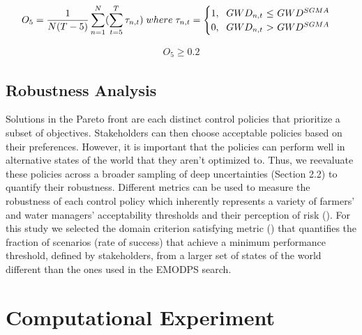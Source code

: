 \documentclass[11pt,a4paper]{article}
\begin{document}
\begin{align}
O_{5} = \frac{1}{N(T-5)}\sum_{n=1}^N(\sum_{t=5}^T \tau_{n,t})\; where\; \tau_{n,t} = \begin{cases}
      1, \text{\; $GWD_{n,t}$  $\leq$ $GWD^{SGMA}$}\\
      0, \text{\; $GWD_{n,t}$ $>$ $GWD^{SGMA}$}\\
\end{cases}      
\end{align}


\begin{align}
O_{5} \geq 0.2
\end{align}

\subsection{Robustness Analysis}

Solutions in the Pareto front are each distinct control policies that prioritize a subset of objectives. Stakeholders can then choose acceptable policies based on their preferences. However, it is important that the policies can perform well in alternative states of the world that they aren’t optimized to. Thus, we reevaluate these policies across a broader sampling of deep uncertainties (Section 2.2) to quantify their robustness. Different metrics can be used to measure the robustness of each control policy which inherently represents a variety of farmers’ and water managers’ acceptability thresholds and their perception of risk (\cite{mcphail_robustness_2018}). For this study we selected the domain criterion satisfying metric  (\cite{schneller_decision_1983}) that quantifies the fraction of scenarios (rate of success) that achieve a minimum performance threshold, defined by stakeholders, from a larger set of states of the world different than the ones used in the EMODPS search. 



\section{Computational Experiment}
\end{document}
